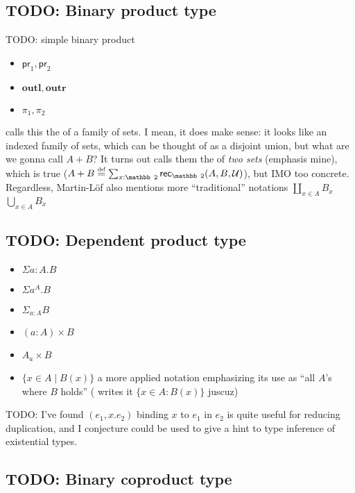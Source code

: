 \documentclass[11pt]{article} %
\theoremstyle{definition}
\theoremstyle{remark}
\begin{document}
\subsection{TODO: Binary product type}
TODO: simple binary product

\begin{itemize}
  \item $\mathsf{pr}_1, \mathsf{pr}_2$
  \item $\mathbf{outl}, \mathbf{outr}$
  \item $\pi_1, \pi_2$
\end{itemize}

\cite{martin-lof_1984} calls this the  of a family of sets.
I mean, it does make sense: it looks like an indexed family of sets, which can be thought of as a disjoint union, but what are we gonna call $A + B$?
It turns out \cite{martin-lof_1984} calls them the  of \emph{two sets} (emphasis mine), which is true ($A + B \defeq \sum_{x:\mathbb 2}\rec_\mathbb 2(A, B, \U)$), but IMO too concrete.
Regardless, Martin-L\"of also mentions more ``traditional'' notations $\coprod_{x \in A}B_x$ $\bigcup_{x \in A}B_x$

\subsection{TODO: Dependent product type}

\begin{itemize}
  \item $\Sigma a:A. B$
  \item $\Sigma a^A. B$
  \item $\Sigma_{a:A}B$
  \item $(a:A) \times B$
  \item $A \mathbin{_a{\times}} B$
  \item $\{x \in A \mid B(x) \}$ a more applied notation emphasizing its use as ``all $A$'s where $B$ holds'' (\cite{martin-lof_1984} writes it $\{x \in A : B(x) \}$ juscuz)
\end{itemize}

TODO: I've found $(e_1, x.e_2)$ binding $x$ to $e_1$ in $e_2$ is quite useful for reducing duplication, and I conjecture could be used to give a hint to type inference of existential types.

\subsection{TODO: Binary coproduct type}
\end{document}
